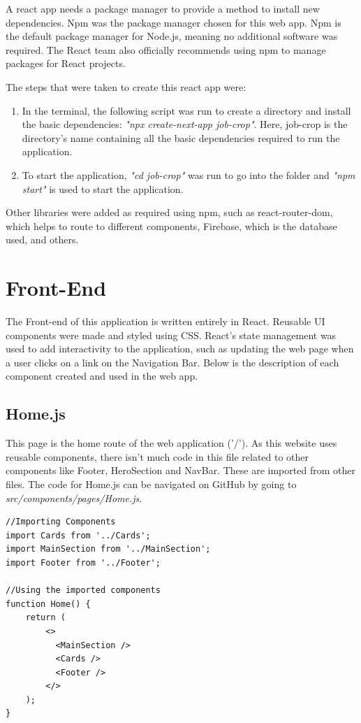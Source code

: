 A react app needs a package manager to provide a method to install new dependencies. Npm was the package manager chosen for this web app. Npm is the default package manager for Node.js, meaning no additional software was required. The React team also officially recommends using npm to manage packages for React projects.

The steps that were taken to create this react app were:
\begin{enumerate}
    \item In the terminal, the following script was run to create a directory and install the basic dependencies: \textit{"npx create-next-app job-crop"}. Here, job-crop is the directory's name containing all the basic dependencies required to run the application. 
    \item To start the application, \textit{"cd job-crop"} was run to go into the folder and \textit{"npm start"} is used to start the application.
\end{enumerate}

Other libraries were added as required using npm, such as react-router-dom, which helps to route to different components, Firebase, which is the database used, and others. 

\section{Front-End}
The Front-end of this application is written entirely in React. Reusable UI components were made and styled using CSS. React's state management was used to add interactivity to the application, such as updating the web page when a user clicks on a link on the Navigation Bar. Below is the description of each component created and used in the web app.

\subsection{Home.js}
This page is the home route of the web application ('/'). As this website uses reusable components, there isn't much code in this file related to other components like Footer, HeroSection and NavBar. These are imported from other files. The code for Home.js can be navigated on GitHub by going to \newline \textit{src/components/pages/Home.js}.

\begin{lstlisting}
//Importing Components
import Cards from '../Cards';
import MainSection from '../MainSection';
import Footer from '../Footer';

//Using the imported components
function Home() {
    return (
        <>
          <MainSection />
          <Cards />
          <Footer />
        </>
    );
}
\end{lstlisting}


